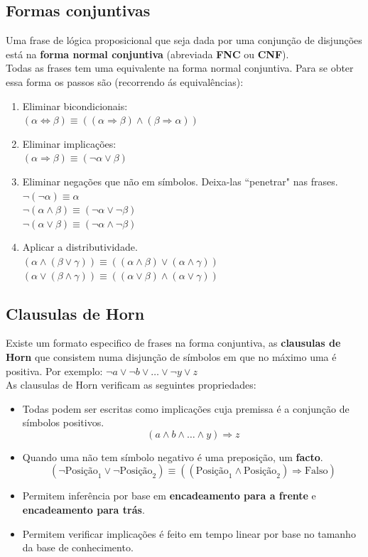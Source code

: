 \documentclass[]{report}
\begin{document}
\subsection{Formas conjuntivas}
Uma frase de lógica proposicional que seja dada por uma conjunção de disjunções está na \textbf{forma normal conjuntiva} (abreviada \textbf{FNC} ou \textbf{CNF}).\\
Todas as frases tem uma equivalente na forma normal conjuntiva. Para se obter essa forma os passos são (recorrendo ás equivalências):
\begin{enumerate}
\item Eliminar bicondicionais:\\
$(\alpha \Leftrightarrow \beta) \equiv ((\alpha \Rightarrow \beta) \wedge (\beta \Rightarrow \alpha))$
\item Eliminar implicações:\\
$(\alpha \Rightarrow \beta) \equiv (\neg \alpha \vee \beta)$
\item Eliminar negações que não em símbolos. Deixa-las ``penetrar" nas frases.\\
$\neg(\neg \alpha) \equiv \alpha$\\
$\neg(\alpha \wedge \beta) \equiv (\neg \alpha \vee \neg \beta)$\\
$\neg(\alpha \vee \beta) \equiv (\neg \alpha \wedge \neg \beta)$
\item Aplicar a distributividade.\\
$(\alpha \wedge (\beta \vee \gamma)) \equiv ((\alpha \wedge \beta) \vee (\alpha \wedge \gamma))$\\
$(\alpha \vee (\beta \wedge \gamma)) \equiv ((\alpha \vee \beta) \wedge (\alpha \vee \gamma))$
\end{enumerate}
\subsection{Clausulas de Horn}
Existe um formato especifico de frases na forma conjuntiva, as \textbf{clausulas de Horn} que consistem numa disjunção de símbolos em que no máximo uma é positiva. Por exemplo: $\neg a \vee \neg b \vee \dots \vee \neg y \vee z$\\
As clausulas de Horn verificam as seguintes propriedades:
\begin{itemize}
\item Todas podem ser escritas como implicações cuja premissa é a conjunção de símbolos positivos.
$$(a \wedge b \wedge \dots \wedge y) \Rightarrow z$$
\item Quando uma não tem símbolo negativo é uma preposição, um \textbf{facto}.
$$(\neg \text{Posição}_1 \vee \neg \text{Posição}_2) \equiv ((\text{Posição}_1 \wedge \text{Posição}_2) \Rightarrow \text{Falso})$$
\item Permitem inferência por base em \textbf{encadeamento para a frente} e \textbf{encadeamento para trás}.
\item Permitem verificar implicações é feito em tempo linear por base no tamanho da base de conhecimento.
\end{itemize}
\end{document}
